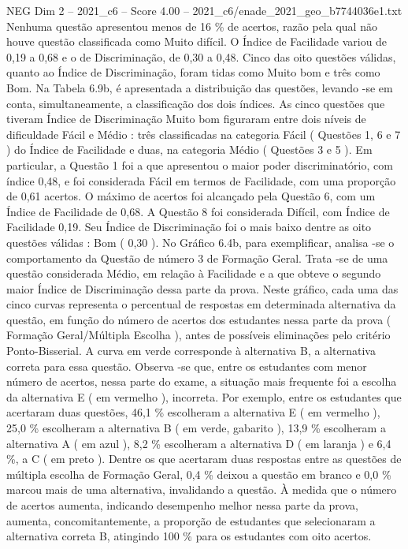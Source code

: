 \begin{textsample}{NEG Dim 2 – 2021\_c6 – Score 4.00 – 2021\_c6/enade\_2021\_geo\_b7744036e1.txt}
Nenhuma questão apresentou menos de 16 \% de acertos, razão pela qual não houve questão classificada como Muito difícil.
O Índice de Facilidade variou de 0,19 a 0,68 e o de Discriminação, de 0,30 a 0,48.
Cinco das oito questões válidas, quanto ao Índice de Discriminação, foram tidas como Muito bom e três como Bom.
Na Tabela 6.9b, é apresentada a distribuição das questões, levando -se em conta, simultaneamente, a classificação dos dois índices.
As cinco questões que tiveram Índice de Discriminação Muito bom figuraram entre dois níveis de dificuldade Fácil e Médio : três classificadas na categoria Fácil ( Questões 1, 6 e 7 ) do Índice de Facilidade e duas, na categoria Médio ( Questões 3 e 5 ).
Em particular, a Questão 1 foi a que apresentou o maior poder discriminatório, com índice 0,48, e foi considerada Fácil em termos de Facilidade, com uma proporção de 0,61 acertos.
O máximo de acertos foi alcançado pela Questão 6, com um Índice de Facilidade de 0,68.
A Questão 8 foi considerada Difícil, com Índice de Facilidade 0,19.
Seu Índice de Discriminação foi o mais baixo dentre as oito questões válidas : Bom ( 0,30 ).
No Gráfico 6.4b, para exemplificar, analisa -se o comportamento da Questão de número 3 de Formação Geral.
Trata -se de uma questão considerada Médio, em relação à Facilidade e a que obteve o segundo maior Índice de Discriminação dessa parte da prova.
Neste gráfico, cada uma das cinco curvas representa o percentual de respostas em determinada alternativa da questão, em função do número de acertos dos estudantes nessa parte da prova ( Formação Geral/Múltipla Escolha ), antes de possíveis eliminações pelo critério Ponto-Bisserial.
A curva em verde corresponde à alternativa B, a alternativa correta para essa questão.
Observa -se que, entre os estudantes com menor número de acertos, nessa parte do exame, a situação mais frequente foi a escolha da alternativa E ( em vermelho ), incorreta.
Por exemplo, entre os estudantes que acertaram duas questões, 46,1 \% escolheram a alternativa E ( em vermelho ), 25,0 \% escolheram a alternativa B ( em verde, gabarito ), 13,9 \% escolheram a alternativa A ( em azul ), 8,2 \% escolheram a alternativa D ( em laranja ) e 6,4 \%, a C ( em preto ).
Dentre os que acertaram duas respostas entre as questões de múltipla escolha de Formação Geral, 0,4 \% deixou a questão em branco e 0,0 \% marcou mais de uma alternativa, invalidando a questão.
À medida que o número de acertos aumenta, indicando desempenho melhor nessa parte da prova, aumenta, concomitantemente, a proporção de estudantes que selecionaram a alternativa correta B, atingindo 100 \% para os estudantes com oito acertos.

\end{textsample}
